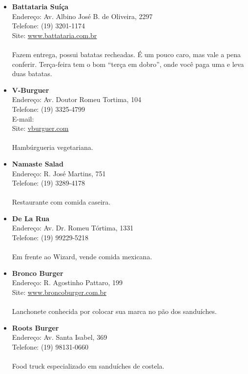 \begin{itemize}
\item \textbf{Battataria Suíça}
  \\Endereço: Av. Albino José B. de Oliveira, 2297
  \\Telefone: (19) 3201-1174
  \\Site: \url{www.battataria.com.br}
  \\
  \\Fazem entrega, possui batatas recheadas. É um pouco caro, mas vale a pena
  conferir. Terça-feira tem o bom ``terça em dobro'', onde você paga uma e leva
  duas batatas.

\item \textbf{V-Burguer}
  \\Endereço: Av. Doutor Romeu Tortima, 104
  \\Telefone: (19) 3325-4799
  \\E-mail: 
  \\Site: \url{vburguer.com}
  \\
  \\Hambúrgueria vegetariana.

\item \textbf{Namaste Salad}
  \\Endereço: R. José Martins, 751
  \\Telefone: (19) 3289-4178
  \\
  \\Restaurante com comida caseira.

\item \textbf{De La Rua}
  \\Endereço: Av. Dr. Romeu Tórtima, 1331
  \\Telefone: (19) 99229-5218
  \\
  \\Em frente ao Wizard, vende comida mexicana.

\item \textbf{Bronco Burger}
  \\Endereço: R. Agostinho Pattaro, 199
  \\Site: \url{www.broncoburger.com.br}
  \\
  \\Lanchonete conhecida por colocar sua marca no pão dos sanduíches.

\item \textbf{Roots Burger}
  \\Endereço: Av. Santa Isabel, 369
  \\Telefone: (19) 98131-0660
  \\
  \\Food truck especializado em sanduíches de costela.
\end{itemize}

